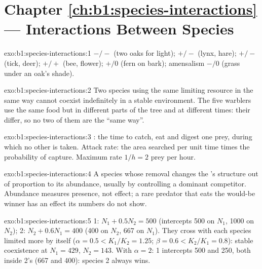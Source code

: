 \section*{Chapter \ref{ch:b1:species-interactions} --- Interactions Between Species}

\begin{solution}{exo:b1:species-interactions:1}
 $-/-$ (two oaks for light);  $+/-$ (lynx, hare);
 $+/-$ (tick, deer);  $+/+$ (bee, flower);
 $+/0$ (fern on bark); amensalism $-/0$ (grass under an
oak's shade).
\end{solution}

\begin{solution}{exo:b1:species-interactions:2}
Two species using the same limiting resource in the same way cannot
coexist indefinitely in a stable environment. The five warblers use
the same food but in different parts of the tree and at different
times: their  differ, so no two of them are the ``same way''.
\end{solution}

\begin{solution}{exo:b1:species-interactions:3}
: the time to catch, eat and digest one prey, during
which no other is taken. Attack rate: the area searched per unit time
times the probability of capture. Maximum rate $1/h = 2$ prey per
hour.
\end{solution}

\begin{solution}{exo:b1:species-interactions:4}
A species whose removal changes the 's structure out of
proportion to its abundance, usually by controlling a dominant
competitor. Abundance measures presence, not effect; a rare predator
that eats the would-be winner has an effect its numbers do not show.
\end{solution}

\begin{solution}{exo:b1:species-interactions:5}
 1: $N_1 + 0.5 N_2 = 500$ (intercepts 500 on $N_1$, 1000 on
$N_2$);  2: $N_2 + 0.6 N_1 = 400$ (400 on $N_2$, 667 on $N_1$).
They cross with each species limited more by itself ($\alpha = 0.5 <
K_1/K_2 = 1.25$; $\beta = 0.6 < K_2/K_1 = 0.8$): stable coexistence
at $N_1 = 429$, $N_2 = 143$. With $\alpha = 2$:  1 intercepts
500 and 250, both inside  2's (667 and 400): species 2
always wins.
\end{solution}

